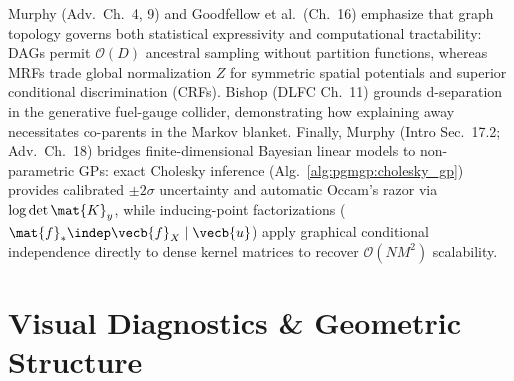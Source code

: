 \documentclass[../../../../master.tex]{subfiles}
\begin{document}
\begin{crossbook}
Murphy (Adv.~Ch.~4, 9) and Goodfellow et al.~(Ch.~16) emphasize that graph topology governs both statistical expressivity and computational tractability: DAGs permit $\mathcal{O}(D)$ ancestral sampling without partition functions, whereas MRFs trade global normalization $Z$ for symmetric spatial potentials and superior conditional discrimination (CRFs). Bishop (DLFC Ch.~11) grounds d-separation in the generative fuel-gauge collider, demonstrating how explaining away necessitates co-parents in the Markov blanket. Finally, Murphy (Intro Sec.~17.2; Adv.~Ch.~18) bridges finite-dimensional Bayesian linear models to non-parametric GPs: exact Cholesky inference (Alg.~\ref{alg:pgmgp:cholesky_gp}) provides calibrated $\pm 2\sigma$ uncertainty and automatic Occam's razor via $\log\det\mat{K}_y$, while inducing-point factorizations ($\mat{f}_* \indep \vecb{f}_X \mid \vecb{u}$) apply graphical conditional independence directly to dense kernel matrices to recover $\mathcal{O}(NM^2)$ scalability.
\end{crossbook}

\section{Visual Diagnostics \& Geometric Structure}
\label{sec:pgmgp:visuals}

\end{document}
